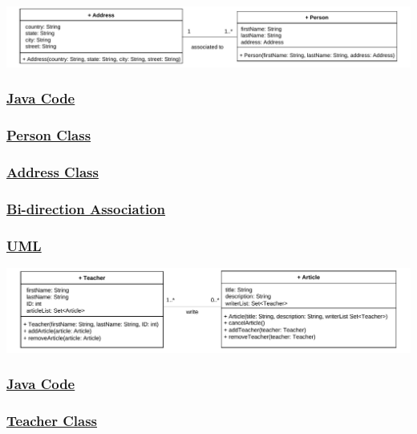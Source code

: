 \includegraphics[width=\textwidth]{Chapters/Diagram/OOP/EX2/ex2.b.drawio.pdf}

\subsubsection*{\underline{Java Code}}

\subsubsection*{\underline{Person Class}}


\newpage
\subsubsection*{\underline{Address Class}}


\subsubsection*{\underline{Bi-direction Association}}
\subsubsection*{\underline{UML}}

\includegraphics[width=\textwidth]{Chapters/Diagram/OOP/EX2/ex2.c.drawio.pdf}

\subsubsection*{\underline{Java Code}}

\vspace{-0.2cm}
\subsubsection*{\underline{Teacher Class}}

